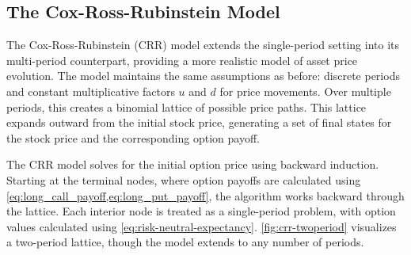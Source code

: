 \documentclass[english,12pt,a4paper,pdftex,sci,utf8]{aaltothesis}
\begin{document}
\subsection{The Cox-Ross-Rubinstein Model}

The Cox-Ross-Rubinstein (CRR) model \cite{cox1979option} extends the single-period setting into its multi-period counterpart, providing a more realistic model of asset price evolution. The model maintains the same assumptions as before: discrete periods and constant multiplicative factors $u$ and $d$ for price movements. Over multiple periods, this creates a binomial lattice of possible price paths. This lattice expands outward from the initial stock price, generating a set of final states for the stock price and the corresponding option payoff.

The CRR model solves for the initial option price using backward induction. Starting at the terminal nodes, where option payoffs are calculated using \cref{eq:long_call_payoff,eq:long_put_payoff}, the algorithm works backward through the lattice. Each interior node is treated as a single-period problem, with option values calculated using \cref{eq:risk-neutral-expectancy}. \cref{fig:crr-twoperiod} visualizes a two-period lattice, though the model extends to any number of periods.
\end{document}
